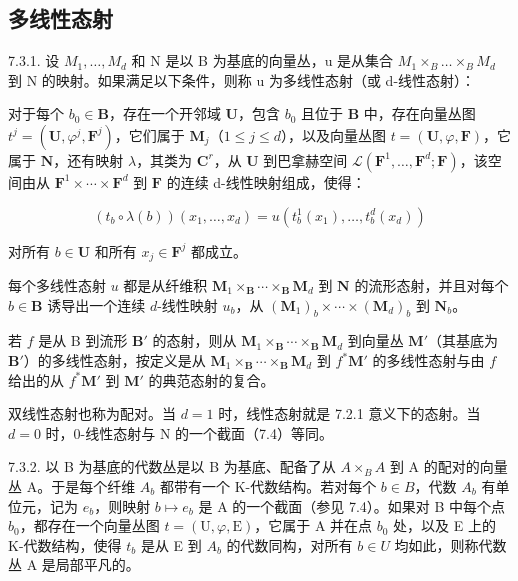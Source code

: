 \subsection{多线性态射}

7.3.1. 设 \(M_{1},\ldots,M_{d}\) 和 N 是以 B 为基底的向量丛，u 是从集合 \(M_{1}\times_{B}\ldots\times_{B}M_{d}\) 到 N 的映射。如果满足以下条件，则称 u 为多线性态射（或 d-线性态射）：

对于每个 \(b_0 \in \mathbf{B}\)，存在一个开邻域 \(\mathbf{U}\)，包含 \(b_0\) 且位于 \(\mathbf{B}\) 中，存在向量丛图 \(t^j = (\mathbf{U}, \varphi^j, \mathbf{F}^j)\)，它们属于 \(\mathbf{M}_j\)（\(1 \leqslant j \leqslant d\)），以及向量丛图 \(t = (\mathbf{U}, \varphi, \mathbf{F})\)，它属于 \(\mathbf{N}\)，还有映射 \(\lambda\)，其类为 \(\mathbf{C}^r\)，从 \(\mathbf{U}\) 到巴拿赫空间 \(\mathcal{L}(\mathbf{F}^1, \ldots, \mathbf{F}^d; \mathbf{F})\)，该空间由从 \(\mathbf{F}^1 \times \cdots \times \mathbf{F}^d\) 到 \(\mathbf{F}\) 的连续 d-线性映射组成，使得：

\[
(t _ {b} \circ \lambda (b)) (x _ {1}, \dots , x _ {d}) = u (t _ {b} ^ {1} (x _ {1}), \dots , t _ {b} ^ {d} (x _ {d}))
\]

对所有 \(b \in \mathbf{U}\) 和所有 \(x_{j} \in \mathbf{F}^{j}\) 都成立。

每个多线性态射 \(u\) 都是从纤维积 \(\mathbf{M}_{1} \times_{\mathbf{B}} \cdots \times_{\mathbf{B}} \mathbf{M}_{d}\) 到 \(\mathbf{N}\) 的流形态射，并且对每个 \(b \in \mathbf{B}\) 诱导出一个连续 \(d\)-线性映射 \(u_b\)，从 \((\mathbf{M}_{1})_{b} \times \cdots \times (\mathbf{M}_{d})_{b}\) 到 \(\mathbf{N}_{b}\)。

若 \(f\) 是从 B 到流形 \(\mathbf{B}'\) 的态射，则从 \(\mathbf{M}_1 \times_{\mathbf{B}} \cdots \times_{\mathbf{B}} \mathbf{M}_d\) 到向量丛 \(\mathbf{M}'\)（其基底为 \(\mathbf{B}'\)）的多线性态射，按定义是从 \(\mathbf{M}_1 \times_{\mathbf{B}} \cdots \times_{\mathbf{B}} \mathbf{M}_d\) 到 \(f^*\mathbf{M}'\) 的多线性态射与由 \(f\) 给出的从 \(f^*\mathbf{M}'\) 到 \(\mathbf{M}'\) 的典范态射的复合。

双线性态射也称为配对。当 \(d=1\) 时，线性态射就是 7.2.1 意义下的态射。当 \(d=0\) 时，0-线性态射与 N 的一个截面（7.4）等同。

7.3.2. 以 B 为基底的代数丛是以 B 为基底、配备了从 \(A \times_{B} A\) 到 A 的配对的向量丛 A。于是每个纤维 \(A_{b}\) 都带有一个 K-代数结构。若对每个 \(b \in B\)，代数 \(A_{b}\) 有单位元，记为 \(e_{b}\)，则映射 \(b \mapsto e_{b}\) 是 A 的一个截面（参见 7.4）。如果对 B 中每个点 \(b_{0}\)，都存在一个向量丛图 \(t = (\mathrm{U}, \varphi, \mathrm{E})\)，它属于 A 并在点 \(b_{0}\) 处，以及 E 上的 K-代数结构，使得 \(t_{b}\) 是从 E 到 \(A_{b}\) 的代数同构，对所有 \(b \in U\) 均如此，则称代数丛 A 是局部平凡的。

